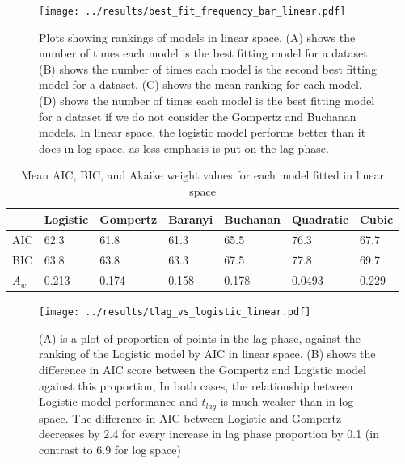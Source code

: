 \documentclass[11pt, a4paper]{article}
\begin{document}
        
                \begin{figure}[H]
        \texttt{[image: ../results/best\_fit\_frequency\_bar\_linear.pdf]}
        \centering
        \caption{Plots showing rankings of models in linear space. (A) shows the number of times each model is the best fitting model for a dataset. (B) shows the number of times each model is the second best fitting model for a dataset. (C) shows the mean ranking for each model. (D) shows the number of times each model is the best fitting model for a dataset if we do not consider the Gompertz and Buchanan models.  In linear space, the logistic model performs better than it does in log space, as less emphasis is put on the lag phase.}
        \label{sup:frequency_bar_linear}
        \end{figure} 
        
                        \begin{table}[H]
\centering
\begin{tabular}{l|llllll}
       & Logistic & Gompertz & Baranyi & Buchanan & Quadratic & Cubic \\ \hline
AIC & 62.3    & 61.8    & 61.3   & 65.5    & 76.3     & 67.7 \\
BIC & 63.8    & 63.8    & 63.3   & 67.5    & 77.8     & 69.7 \\
$A_w$ & 0.213     & 0.174    & 0.158   & 0.178     & 0.0493     &   0.229

\end{tabular}
\caption{Mean AIC, BIC, and Akaike weight values for each model fitted in linear space}
\label{suptable:meanAICBIClinear}
\end{table}




        
                        \begin{figure}[H]
        \texttt{[image: ../results/tlag\_vs\_logistic\_linear.pdf]}
        \centering
        \caption{(A) is a plot of proportion of points in the lag phase, against the ranking of the Logistic model by AIC in linear space. (B) shows the difference in AIC score between the Gompertz and Logistic model against this proportion, In both cases, the relationship between Logistic model performance and $t_{lag}$ is much weaker than in log space. The difference in AIC between Logistic and Gompertz decreases by 2.4 for every increase in lag phase proportion by 0.1 (in contrast to 6.9 for log space)}
        \label{sup:tlag_logistic_linear}
        \end{figure} 
        
\end{document}
